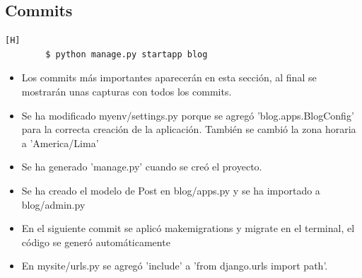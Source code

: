 \documentclass{article}
\begin{document}
	\subsection{Commits}
	\begin{lstlisting}[language=bash,caption={Primero se crea una aplicación llamada blog}][H]
		$ python manage.py startapp blog
	\end{lstlisting}
	
	\begin{itemize}	
		\item Los commits más importantes aparecerán en esta sección, al final se mostrarán unas capturas con todos los commits.
	\end{itemize}
        \begin{itemize}	
		\item Se ha modificado myenv/settings.py porque se agregó 'blog.apps.BlogConfig' para la correcta creación de la aplicación. También se cambió la zona horaria a 'America/Lima'
	\end{itemize}
        
        \begin{itemize}	
		\item Se ha generado 'manage.py' cuando se creó el proyecto.
	\end{itemize}
        
        \begin{itemize}	
		\item Se ha creado el modelo de Post en blog/apps.py y se ha importado a blog/admin.py
	\end{itemize}
        
        
        
        \begin{itemize}	
		\item En el siguiente commit se aplicó makemigrations y migrate en el terminal, el código se generó automáticamente
	\end{itemize}
        \begin{itemize}	
		\item En mysite/urls.py se agregó 'include' a 'from django.urls import path'.
	\end{itemize}
        
\end{document}
